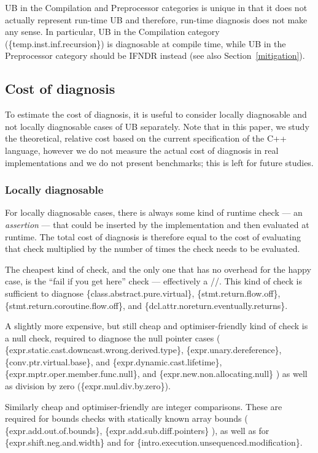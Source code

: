 UB in the Compilation and Preprocessor categories is unique in that it does not actually represent run-time UB and therefore, run-time diagnosis does not make any sense. In particular, UB in the Compilation category (\{temp.inst.inf.recursion\}) is diagnosable at compile time, while UB in the Preprocessor category should be IFNDR instead (see also Section~\ref{mitigation}).

\subsection{Cost of diagnosis}
\label{cost}

To estimate the cost of diagnosis, it is useful to consider locally diagnosable and not locally diagnosable cases of UB separately. Note that in this paper, we study the theoretical, relative cost based on the current specification of the C++ language, however we do not measure the actual cost of diagnosis in real implementations and we do not present benchmarks; this is left for future studies.

\subsubsection{Locally diagnosable}

For locally diagnosable cases, there is always some kind of runtime check --- an \emph{assertion} --- that could be inserted by the implementation and then evaluated at runtime. The total cost of diagnosis is therefore equal to the cost of evaluating that check multiplied by the number of times the check needs to be evaluated.

The cheapest kind of check, and the only one that has no overhead for the happy case, is the ``fail if you get here'' check --- effectively a //. This kind of check is sufficient to diagnose \{class.abstract.pure.virtual\}, \{stmt.return.flow.off\}, \{stmt.return.coroutine.flow.off\}, and \{dcl.attr.noreturn.eventually.returns\}.

A slightly more expensive, but still cheap and optimiser-friendly kind of check is a null check, required to diagnose the null pointer cases  
(
\{expr.static.cast.downcast.wrong.derived.type\},
\{expr.unary.dereference\},
\{conv.ptr.virtual.base\}, and
\{expr.dynamic.cast.lifetime\}, 
\{expr.mptr.oper.member.func.null\}, and
\{expr.new.non.allocating.null\}
) as well as division by zero (\{expr.mul.div.by.zero\}).

Similarly cheap and optimiser-friendly are integer comparisons. These are  required for bounds checks with statically known array bounds
(
\{expr.add.out.of.bounds\},
\{expr.add.sub.diff.pointers\}
), as well as for \{expr.shift.neg.and.width\} and for \{intro.execution.unsequenced.modification\}.


